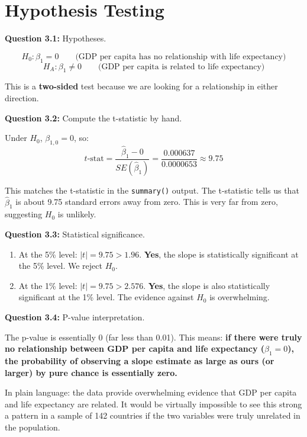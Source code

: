 \documentclass[11pt,letterpaper]{article}
\begin{document}
\section{Hypothesis Testing}

\textbf{Question 3.1:} Hypotheses.

\begin{answer}
\[
H_0: \beta_1 = 0 \qquad \text{(GDP per capita has no relationship with life expectancy)}
\]
\[
H_A: \beta_1 \neq 0 \qquad \text{(GDP per capita is related to life expectancy)}
\]

This is a \textbf{two-sided} test because we are looking for a relationship in either direction.
\end{answer}

\textbf{Question 3.2:} Compute the t-statistic by hand.

\begin{answer}
Under $H_0$, $\beta_{1,0} = 0$, so:
\[
t\text{-stat} = \frac{\hat{\beta}_1 - 0}{SE(\hat{\beta}_1)} = \frac{0.000637}{0.0000653} \approx 9.75
\]

This matches the t-statistic in the \texttt{summary()} output. The t-statistic tells us that $\hat{\beta}_1$ is about 9.75 standard errors away from zero. This is very far from zero, suggesting $H_0$ is unlikely.
\end{answer}

\textbf{Question 3.3:} Statistical significance.

\begin{answer}
\begin{enumerate}[label=(\alph*)]
\item At the 5\% level: $|t| = 9.75 > 1.96$. \textbf{Yes}, the slope is statistically significant at the 5\% level. We reject $H_0$.

\item At the 1\% level: $|t| = 9.75 > 2.576$. \textbf{Yes}, the slope is also statistically significant at the 1\% level. The evidence against $H_0$ is overwhelming.
\end{enumerate}
\end{answer}

\textbf{Question 3.4:} P-value interpretation.

\begin{answer}
The p-value is essentially 0 (far less than 0.01). This means: \textbf{if there were truly no relationship between GDP per capita and life expectancy ($\beta_1 = 0$), the probability of observing a slope estimate as large as ours (or larger) by pure chance is essentially zero.}

In plain language: the data provide overwhelming evidence that GDP per capita and life expectancy are related. It would be virtually impossible to see this strong a pattern in a sample of 142 countries if the two variables were truly unrelated in the population.
\end{answer}
\end{document}
